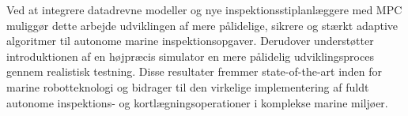 Ved at integrere datadrevne modeller og nye inspektionsstiplanlæggere med MPC muliggør dette arbejde udviklingen af mere pålidelige, sikrere og stærkt adaptive algoritmer til autonome marine inspektionsopgaver. Derudover understøtter introduktionen af en højpræcis simulator en mere pålidelig udviklingsproces gennem realistisk testning. Disse resultater fremmer state-of-the-art inden for marine robotteknologi og bidrager til den virkelige implementering af fuldt autonome inspektions- og kortlægningsoperationer i komplekse marine miljøer.


        
        
        
        



